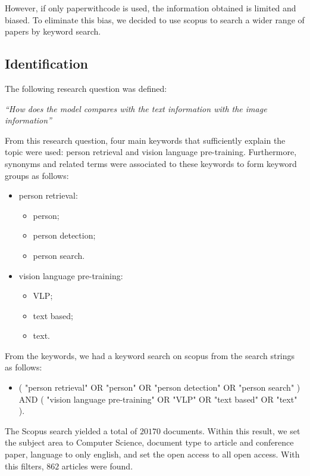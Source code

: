 However, if only paperwithcode is used, the information obtained is limited and biased. To eliminate this bias, we decided to use scopus to search a wider range of papers by keyword search.

\subsection*{Identification}

The following research question was defined:

\bigskip
\textit{``How does the model compares with the text information with the image information''}
\bigskip



From this research question, four main keywords that sufficiently explain the topic were used: person retrieval and vision language pre-training.
Furthermore, synonyms and related terms were associated to these keywords to form keyword groups as follows:

\begin{itemize}
    \item person retrieval:
    \begin{itemize}
        \item person;
        \item person detection;
        \item person search.
    \end{itemize}
    \item vision language pre-training:
    \begin{itemize}
        \item VLP;
        \item text based;
        \item text.
    \end{itemize}
\end{itemize}


From the keywords, we had a keyword search on scopus from the search strings as follows:

\begin{itemize}
    \item ( "person retrieval" OR "person" OR "person detection" OR "person search" ) AND ( "vision language pre-training" OR "VLP" OR "text based" OR "text" ).
\end{itemize}

The Scopus search yielded a total of $20170$ documents. Within this result, we set the subject area to Computer Science, document type to article and conference paper, language to only english, and set the open access to all open access. With this filters, $862$ articles were found. 

